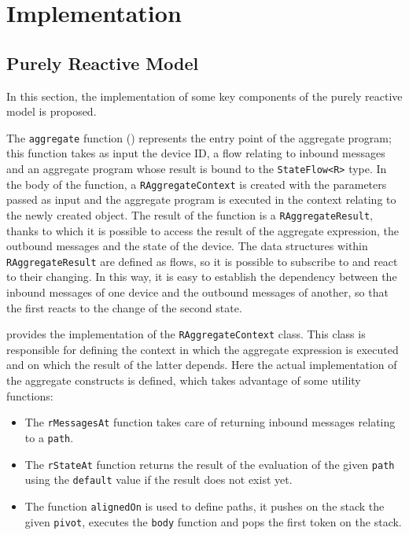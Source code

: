 
\chapter{Implementation}
\label{chap:implementation}

\section{Purely Reactive Model}
\label{section:prm}

In this section, the implementation of some key components of the purely reactive model is proposed.

The \texttt{aggregate} function () represents the entry point of the aggregate program; this function takes as input the device ID, a flow relating to inbound messages and an aggregate program whose result is bound to the \texttt{StateFlow<R>} type. In the body of the function, a \texttt{RAggregateContext} is created with the parameters passed as input and the aggregate program is executed in the context relating to the newly created object. The result of the function is a \texttt{RAggregateResult}, thanks to which it is possible to access the result of the aggregate expression, the outbound messages and the state of the device. The data structures within \texttt{RAggregateResult} are defined as flows, so it is possible to subscribe to and react to their changing. In this way, it is easy to establish the dependency between the inbound messages of one device and the outbound messages of another, so that the first reacts to the change of the second state.

 provides the implementation of the \texttt{RAggregateContext} class. This class is responsible for defining the context in which the aggregate expression is executed and on which the result of the latter depends. Here the actual implementation of the aggregate constructs is defined, which takes advantage of some utility functions:

\begin{itemize}
    \item The \texttt{rMessagesAt} function takes care of returning inbound messages relating to a \texttt{path}.
    \item The \texttt{rStateAt} function returns the result of the evaluation of the given \texttt{path} using the \texttt{default} value if the result does not exist yet.
    \item The function \texttt{alignedOn} is used to define paths, it pushes on the stack the given \texttt{pivot}, executes the \texttt{body} function and pops the first token on the stack.
\end{itemize}

